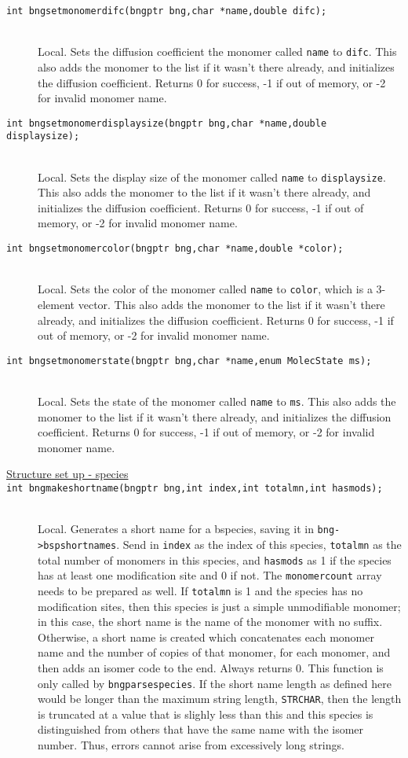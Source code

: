 \documentclass {book}
\newcommand {\ttt} {\texttt}
\begin{document}
\begin{description}
\item[\ttt{int bngsetmonomerdifc(bngptr bng,char *name,double difc);}]
\hfill \\
Local. Sets the diffusion coefficient the monomer called \ttt{name} to \ttt{difc}. This also adds the monomer to the list if it wasn't there already, and initializes the diffusion coefficient. Returns 0 for success, -1 if out of memory, or -2 for invalid monomer name.

\item[\ttt{int bngsetmonomerdisplaysize(bngptr bng,char *name,double displaysize);}]
\hfill \\
Local. Sets the display size of the monomer called \ttt{name} to \ttt{displaysize}. This also adds the monomer to the list if it wasn't there already, and initializes the diffusion coefficient. Returns 0 for success, -1 if out of memory, or -2 for invalid monomer name.

\item[\ttt{int bngsetmonomercolor(bngptr bng,char *name,double *color);}]
\hfill \\
Local. Sets the color of the monomer called \ttt{name} to \ttt{color}, which is a 3-element vector. This also adds the monomer to the list if it wasn't there already, and initializes the diffusion coefficient. Returns 0 for success, -1 if out of memory, or -2 for invalid monomer name.

\item[\ttt{int bngsetmonomerstate(bngptr bng,char *name,enum MolecState ms);}]
\hfill \\
Local. Sets the state of the monomer called \ttt{name} to \ttt{ms}. This also adds the monomer to the list if it wasn't there already, and initializes the diffusion coefficient. Returns 0 for success, -1 if out of memory, or -2 for invalid monomer name.

\item[\underline{Structure set up - species}]

\item[\ttt{int bngmakeshortname(bngptr bng,int index,int totalmn,int hasmods);}]
\hfill \\
Local. Generates a short name for a bspecies, saving it in \ttt{bng->bspshortnames}. Send in \ttt{index} as the index of this species, \ttt{totalmn} as the total number of monomers in this species, and \ttt{hasmods} as 1 if the species has at least one modification site and 0 if not. The \ttt{monomercount} array needs to be prepared as well. If \ttt{totalmn} is 1 and the species has no modification sites, then this species is just a simple unmodifiable monomer; in this case, the short name is the name of the monomer with no suffix. Otherwise, a short name is created which concatenates each monomer name and the number of copies of that monomer, for each monomer, and then adds an isomer code to the end. Always returns 0. This function is only called by \ttt{bngparsespecies}. If the short name length as defined here would be longer than the maximum string length, \ttt{STRCHAR}, then the length is truncated at a value that is slighly less than this and this species is distinguished from others that have the same name with the isomer number. Thus, errors cannot arise from excessively long strings.


\end{description}
\end{document}

